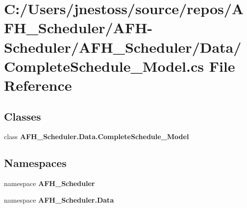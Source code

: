 \section{C\+:/\+Users/jnestoss/source/repos/\+A\+F\+H\+\_\+\+Scheduler/\+A\+F\+H-\/\+Scheduler/\+A\+F\+H\+\_\+\+Scheduler/\+Data/\+Complete\+Schedule\+\_\+\+Model.cs File Reference}
\label{_complete_schedule___model_8cs}
\subsection*{Classes}
\begin{DoxyCompactItemize}
\item 
class \textbf{ A\+F\+H\+\_\+\+Scheduler.\+Data.\+Complete\+Schedule\+\_\+\+Model}
\end{DoxyCompactItemize}
\subsection*{Namespaces}
\begin{DoxyCompactItemize}
\item 
namespace \textbf{ A\+F\+H\+\_\+\+Scheduler}
\item 
namespace \textbf{ A\+F\+H\+\_\+\+Scheduler.\+Data}
\end{DoxyCompactItemize}
